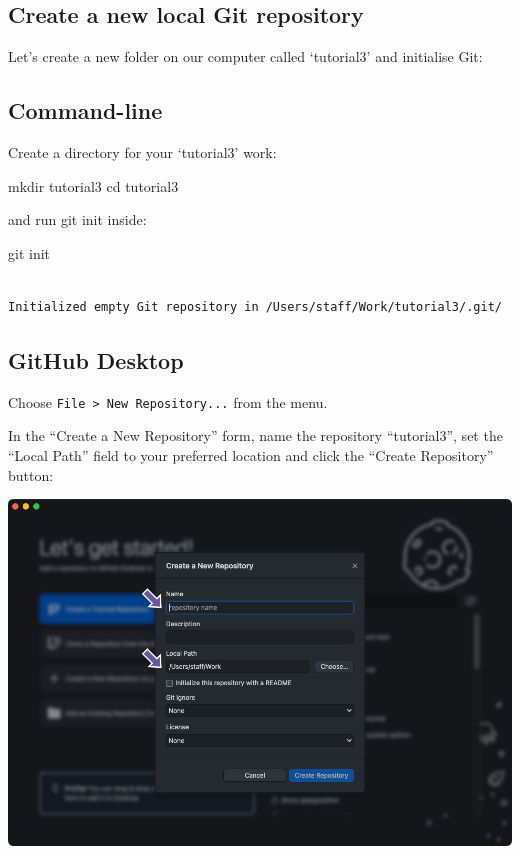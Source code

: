 \documentclass[
  letterpaper,
  DIV=11,
  numbers=noendperiod]{scrartcl}
\newenvironment{Shaded}{\begin{snugshade}}{\end{snugshade}}
\newcommand{\BuiltInTok}[1]{\textcolor[rgb]{0.00,0.23,0.31}{#1}}
\newcommand{\FunctionTok}[1]{\textcolor[rgb]{0.28,0.35,0.67}{#1}}
\newcommand{\NormalTok}[1]{\textcolor[rgb]{0.00,0.23,0.31}{#1}}
\begin{document}
\hypertarget{create-a-new-local-git-repository}{%
\subsection{Create a new local Git
repository}\label{create-a-new-local-git-repository}}

Let's create a new folder on our computer called `tutorial3' and
initialise Git:

\subsection{Command-line}

Create a directory for your `tutorial3' work:

\begin{Shaded}
\begin{Highlighting}[]
\FunctionTok{mkdir}\NormalTok{ tutorial3}
\BuiltInTok{cd}\NormalTok{ tutorial3}
\end{Highlighting}
\end{Shaded}

and run git init inside:

\begin{Shaded}
\begin{Highlighting}[]
\FunctionTok{git}\NormalTok{ init}
\end{Highlighting}
\end{Shaded}

\begin{verbatim}

Initialized empty Git repository in /Users/staff/Work/tutorial3/.git/
\end{verbatim}

\subsection{GitHub Desktop}

Choose \texttt{File\ \textgreater{}\ New\ Repository...} from the menu.

In the ``Create a New Repository'' form, name the repository
``tutorial3'', set the ``Local Path'' field to your preferred location
and click the ``Create Repository'' button:

\includegraphics{images/image27.png}
\end{document}
